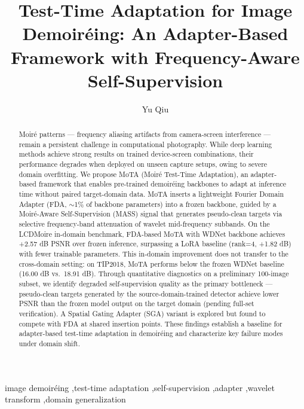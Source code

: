\documentclass[review,10pt]{elsarticle}
\begin{document}
\begin{frontmatter}

\title{Test-Time Adaptation for Image Demoir\'{e}ing: An Adapter-Based Framework with Frequency-Aware Self-Supervision}

\author[hnu]{Yu Qiu}
\address[hnu]{School of Mathematics, Hunan University, Changsha 410082, China}

\begin{abstract}
Moir\'{e} patterns --- frequency aliasing artifacts from camera-screen interference --- remain a persistent challenge in computational photography. While deep learning methods achieve strong results on trained device-screen combinations, their performance degrades when deployed on unseen capture setups, owing to severe domain overfitting. We propose MoTA (Moir\'{e} Test-Time Adaptation), an adapter-based framework that enables pre-trained demoir\'{e}ing backbones to adapt at inference time without paired target-domain data. MoTA inserts a lightweight Fourier Domain Adapter (FDA, $\sim$1\% of backbone parameters) into a frozen backbone, guided by a Moir\'{e}-Aware Self-Supervision (MASS) signal that generates pseudo-clean targets via selective frequency-band attenuation of wavelet mid-frequency subbands. On the LCDMoire in-domain benchmark, FDA-based MoTA with WDNet backbone achieves +2.57 dB PSNR over frozen inference, surpassing a LoRA baseline (rank=4, +1.82 dB) with fewer trainable parameters. This in-domain improvement does not transfer to the cross-domain setting: on TIP2018, MoTA performs below the frozen WDNet baseline (16.00 dB vs.\ 18.91 dB). Through quantitative diagnostics on a preliminary 100-image subset, we identify degraded self-supervision quality as the primary bottleneck --- pseudo-clean targets generated by the source-domain-trained detector achieve lower PSNR than the frozen model output on the target domain (pending full-set verification). A Spatial Gating Adapter (SGA) variant is explored but found to compete with FDA at shared insertion points. These findings establish a baseline for adapter-based test-time adaptation in demoir\'{e}ing and characterize key failure modes under domain shift.
\end{abstract}

\begin{keyword}
image demoir\'{e}ing \sep test-time adaptation \sep self-supervision \sep adapter \sep wavelet transform \sep domain generalization
\end{keyword}

\end{frontmatter}
\end{document}
